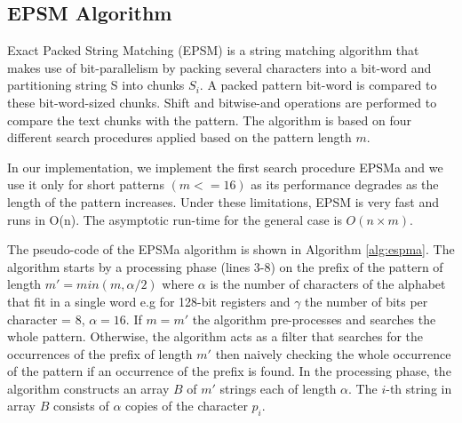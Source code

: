 \subsection{EPSM Algorithm}
Exact Packed String Matching (EPSM) \cite{epsm} is a string matching algorithm that makes use of bit-parallelism by packing several characters into a bit-word and partitioning string S into chunks $S_i$. A packed pattern bit-word is compared to these bit-word-sized chunks. Shift and bitwise-and operations are performed to compare the text chunks with the pattern. The algorithm is based on four different search procedures applied based on the pattern length $m$. 

In our implementation, we implement the first search procedure EPSMa and we use it only for short patterns $(m <= 16)$ as its performance degrades as the length of the pattern increases. Under these limitations, EPSM is very fast and runs in O(n). The asymptotic run-time for the general case is $O(n \times m)$.

The pseudo-code of the EPSMa algorithm is shown in Algorithm \ref{alg:espma}. The algorithm starts by a processing phase (lines 3-8) on the prefix of the pattern of length $m' = min(m, \alpha/2)$ where $\alpha$ is the number of characters of the alphabet that fit in a single word e.g for 128-bit registers and $\gamma$ the number of bits per character = 8, $\alpha = 16$. If $m = m'$ the algorithm pre-processes and searches the whole pattern. Otherwise, the algorithm acts as a filter that searches for the occurrences of the prefix of length $m'$ then naively checking the whole occurrence of the pattern if an occurrence of the prefix is found. In the processing phase, the algorithm  constructs an array $B$ of $m'$ strings each of length $\alpha$. The $i$-th string in array $B$ consists of $\alpha$ copies of the character $p_i$.

